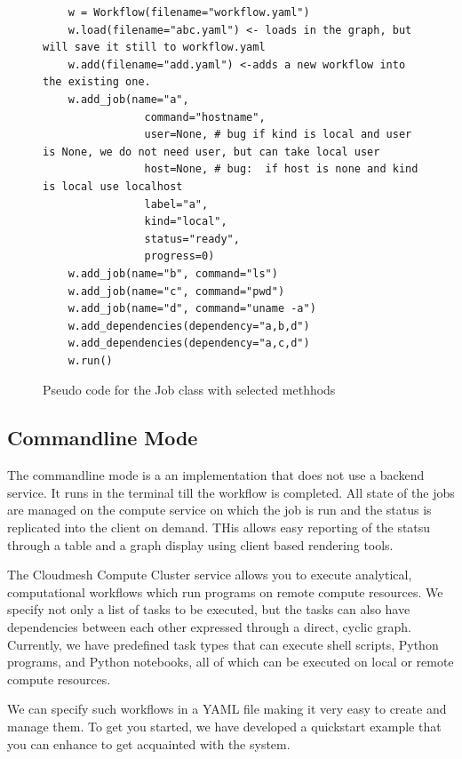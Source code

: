 \begin{figure}[htb]
\caption{Pseudo code for the Job class with selected methhods}
\label{fig:code-workflow-example}
\begin{verbatim}
    w = Workflow(filename="workflow.yaml")
    w.load(filename="abc.yaml") <- loads in the graph, but will save it still to workflow.yaml
    w.add(filename="add.yaml") <-adds a new workflow into the existing one.
    w.add_job(name="a",
                command="hostname",
                user=None, # bug if kind is local and user is None, we do not need user, but can take local user
                host=None, # bug:  if host is none and kind is local use localhost
                label="a",
                kind="local",
                status="ready",
                progress=0)
    w.add_job(name="b", command="ls")
    w.add_job(name="c", command="pwd")
    w.add_job(name="d", command="uname -a")
    w.add_dependencies(dependency="a,b,d")
    w.add_dependencies(dependency="a,c,d")
    w.run()
\end{verbatim}
\end{figure}

\subsection{Commandline Mode}

The commandline mode is a an implementation that does not use a
backend service. It runs in the terminal till the workflow is
completed. All state of the jobs are managed on the compute service on
which the job is run and the status is replicated into the client on
demand. THis allows easy reporting of the statsu through a table and a
graph display using client based rendering tools. 


The Cloudmesh Compute Cluster service allows you to execute analytical,
computational workflows which run programs on remote compute resources.
We specify not only a list of tasks to be executed, but the tasks can
also have dependencies between each other expressed through a direct,
cyclic graph. Currently, we have predefined task types that can execute
shell scripts, Python programs, and Python notebooks, all of which can
be executed on local or remote compute resources.


We can specify such workflows in a YAML file making it very easy to
create and manage them. To get you started, we have developed a
quickstart example that you can enhance to get acquainted with the
system.

